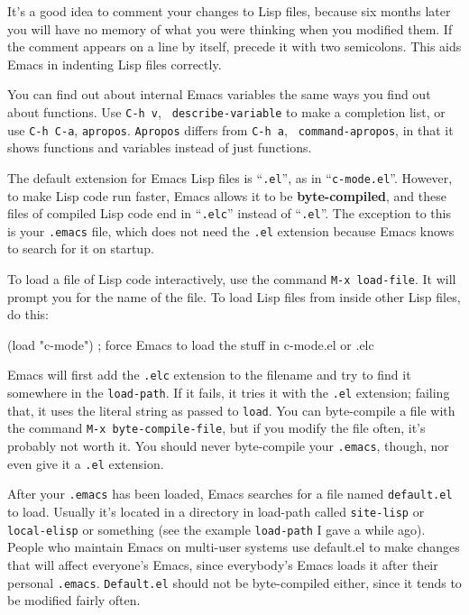         It's a good idea to comment your changes to Lisp files,
because six months later you will have no memory of what you were
thinking when you modified them.  If the comment appears on a line by
itself, precede it with two semicolons.  This aids Emacs in indenting
Lisp files correctly.

        You can find out about internal Emacs variables the same ways
you find out about functions.  Use {\tt C-h~v}, {\tt
describe-variable} to make a completion list, or use {\tt C-h~C-a},
{\tt apropos}.  {\tt Apropos} differs from {\tt C-h~a}, {\tt
command-apropos}, in that it shows functions and variables instead of
just functions.
        
        The default extension for Emacs Lisp files is ``{\tt .el}'',
as in ``{\tt c-mode.el}''.  However, to make Lisp code run faster,
Emacs allows it to be {\bf byte-compiled}, and these files of compiled
Lisp code end in ``{\tt .elc}'' instead of ``{\tt .el}''.  The
exception to this is your {\tt .emacs} file, which does not need the
{\tt .el} extension because Emacs knows to search for it on startup.

        To load a file of Lisp code interactively, use the command
{\tt M-x load-file}.  It will prompt you for the name of the file.  To
load Lisp files from inside other Lisp files, do this:

\begin{screen}
   \begin{tt}
(load "c-mode") ; force Emacs to load the stuff in c-mode.el or .elc
   \end{tt}
\end{screen}

        Emacs will first add the {\tt .elc} extension to the filename
and try to find it somewhere in the {\tt load-path}.  If it fails, it
tries it with the {\tt .el} extension; failing that, it uses the
literal string as passed to {\tt load}.  You can byte-compile a file
with the command {\tt M-x byte-compile-file}, but if you modify the
file often, it's probably not worth it.  You should never byte-compile
your {\tt .emacs}, though, nor even give it a {\tt .el} extension.

        After your {\tt .emacs} has been loaded, Emacs searches for a
file named {\tt default.el} to load.  Usually it's located in a
directory in load-path called {\tt site-lisp} or {\tt local-elisp} or
something (see the example {\tt load-path} I gave a while ago).
People who maintain Emacs on multi-user systems use default.el to make
changes that will affect everyone's Emacs, since everybody's Emacs
loads it after their personal {\tt .emacs}.  {\tt Default.el} should
not be byte-compiled either, since it tends to be modified fairly
often.

